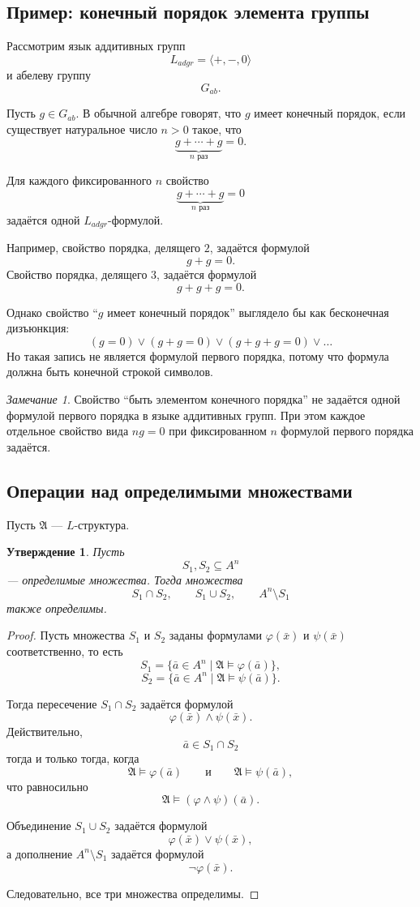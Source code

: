 \documentclass[12pt,a4paper,oneside,openany]{book}
\theoremstyle{definition}
\theoremstyle{plain}
\newtheorem{proposition}{Утверждение}[chapter]
\theoremstyle{remark}
\newtheorem{remark}{Замечание}[chapter]
\begin{document}
\subsection{Пример: конечный порядок элемента группы}

Рассмотрим язык аддитивных групп
\[
L_{adgr}=\langle +,-,0\rangle
\]
и абелеву группу
\[
G_{ab}.
\]

Пусть $g\in G_{ab}$. В обычной алгебре говорят, что $g$ имеет конечный порядок, если существует натуральное число $n>0$ такое, что
\[
\underbrace{g+\cdots+g}_{n\text{ раз}}=0.
\]

Для каждого фиксированного $n$ свойство
\[
\underbrace{g+\cdots+g}_{n\text{ раз}}=0
\]
задаётся одной $L_{adgr}$-формулой.

Например, свойство порядка, делящего $2$, задаётся формулой
\[
g+g=0.
\]
Свойство порядка, делящего $3$, задаётся формулой
\[
g+g+g=0.
\]

Однако свойство ``$g$ имеет конечный порядок'' выглядело бы как бесконечная дизъюнкция:
\[
(g=0)\vee(g+g=0)\vee(g+g+g=0)\vee\ldots
\]
Но такая запись не является формулой первого порядка, потому что формула должна быть конечной строкой символов.

\begin{remark}
Свойство ``быть элементом конечного порядка'' не задаётся одной формулой первого порядка в языке аддитивных групп.
При этом каждое отдельное свойство вида $ng=0$ при фиксированном $n$ формулой первого порядка задаётся.
\end{remark}

\subsection{Операции над определимыми множествами}

Пусть $\mathfrak A$ — $L$-структура.

\begin{proposition}
Пусть
\[
S_1,S_2\subseteq A^n
\]
— определимые множества. Тогда множества
\[
S_1\cap S_2,\qquad S_1\cup S_2,\qquad A^n\setminus S_1
\]
также определимы.
\end{proposition}

\begin{proof}
Пусть множества $S_1$ и $S_2$ заданы формулами $\varphi(\bar x)$ и $\psi(\bar x)$ соответственно, то есть
\[
S_1=\{\bar a\in A^n\mid \mathfrak A\models\varphi(\bar a)\},
\]
\[
S_2=\{\bar a\in A^n\mid \mathfrak A\models\psi(\bar a)\}.
\]

Тогда пересечение $S_1\cap S_2$ задаётся формулой
\[
\varphi(\bar x)\wedge\psi(\bar x).
\]
Действительно,
\[
\bar a\in S_1\cap S_2
\]
тогда и только тогда, когда
\[
\mathfrak A\models\varphi(\bar a)
\qquad\text{и}\qquad
\mathfrak A\models\psi(\bar a),
\]
что равносильно
\[
\mathfrak A\models(\varphi\wedge\psi)(\bar a).
\]

Объединение $S_1\cup S_2$ задаётся формулой
\[
\varphi(\bar x)\vee\psi(\bar x),
\]
а дополнение $A^n\setminus S_1$ задаётся формулой
\[
\neg\varphi(\bar x).
\]

Следовательно, все три множества определимы.
\end{proof}
\end{document}
